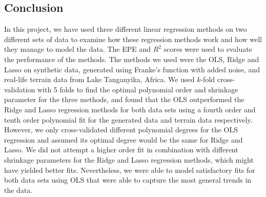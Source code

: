 \documentclass[a4paper, 10pt]{article}
\begin{document}
\begin{multicols}{2}
\section{Conclusion}
In this project, we have used three different linear regression methods on two different sets of data to examine how these regression methods work and how well they manage to model the data. The EPE and $R^2$ scores were used to evaluate the performance of the methods. The methods we used were the OLS, Ridge and Lasso on synthetic data, generated using Franke's function with added noise, and real-life terrain data from Lake Tanganyika, Africa. We used $k$-fold cross-validation with 5 folds  to find the optimal polynomial order and shrinkage parameter  for the three methods, and found that the OLS outperformed the Ridge and Lasso regression methods for both data sets using a fourth order and tenth order polynomial fit for the generated data and terrain data respectively. However, we only cross-validated different polynomial degrees for the OLS regression and assumed its optimal degree would be the same for Ridge and Lasso. We did not attempt a higher order fit in combination with different shrinkage parameters for the Ridge and Lasso regression methods, which might have yielded better fits. Nevertheless, we were able to model satisfactory fits for both data sets using OLS that were able to capture the most general trends in the data. 





\end{multicols}
\end{document}

